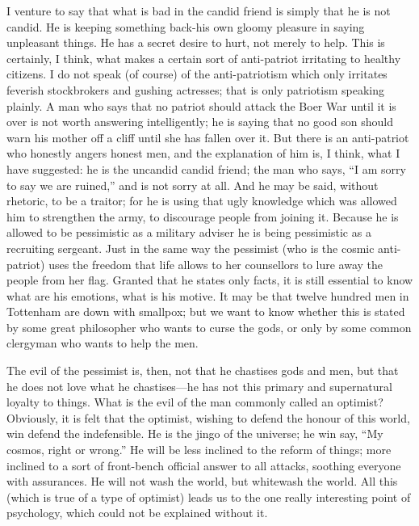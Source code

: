 \documentclass{book}
\begin{document}
I venture to say that what is bad in the candid friend is simply that he is not candid. He is keeping something back-his own gloomy pleasure in saying unpleasant things. He has a secret desire to hurt, not merely to help. This is certainly, I think, what makes a certain sort of anti-patriot irritating to healthy citizens. I do not speak (of course) of the anti-patriotism which only irritates feverish stockbrokers and gushing actresses; that is only patriotism speaking plainly. A man who says that no patriot should attack the Boer War until it is over is not worth answering intelligently; he is saying that no good son should warn his mother off a cliff until she has fallen over it. But there is an anti-patriot who honestly angers honest men, and the explanation of him is, I think, what I have suggested: he is the uncandid candid friend; the man who says, “I am sorry to say we are ruined,” and is not sorry at all. And he may be said, without rhetoric, to be a traitor; for he is using that ugly knowledge which was allowed him to strengthen the army, to discourage people from joining it. Because he is allowed to be pessimistic as a military adviser he is being pessimistic as a recruiting sergeant. Just in the same way the pessimist (who is the cosmic anti-patriot) uses the freedom that life allows to her counsellors to lure away the people from her flag. Granted that he states only facts, it is still essential to know what are his emotions, what is his motive. It may be that twelve hundred men in Tottenham are down with smallpox; but we want to know whether this is stated by some great philosopher who wants to curse the gods, or only by some common clergyman who wants to help the men.

The evil of the pessimist is, then, not that he chastises gods and men, but that he does not love what he chastises—he has not this primary and supernatural loyalty to things. What is the evil of the man commonly called an optimist? Obviously, it is felt that the optimist, wishing to defend the honour of this world, win defend the indefensible. He is the jingo of the universe; he win say, “My cosmos, right or wrong.” He will be less inclined to the reform of things; more inclined to a sort of front-bench official answer to all attacks, soothing everyone with assurances. He will not wash the world, but whitewash the world. All this (which is true of a type of optimist) leads us to the one really interesting point of psychology, which could not be explained without it.
\end{document}
